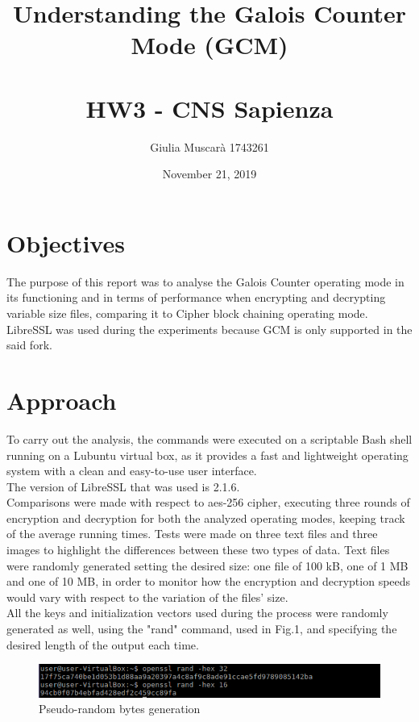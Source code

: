 \documentclass{article}
\title{Understanding the Galois Counter Mode (GCM) \\
	 \large \\ HW3 - CNS Sapienza}
\author{Giulia Muscarà 1743261}
\date{November 21, 2019}
\begin{document}
\maketitle

\section{Objectives}
The purpose of this report was to analyse the Galois Counter operating mode in its functioning and in terms of performance when encrypting and decrypting variable size files, comparing it to Cipher block chaining operating mode. LibreSSL was used during the experiments because GCM is only supported in the said fork.

\section{Approach}
To carry out the analysis, the commands were executed on a scriptable Bash shell running on a Lubuntu virtual box, as it provides a fast and lightweight operating system with a clean and easy-to-use user interface.\\ 
The version of LibreSSL that was used is 2.1.6.\\
Comparisons were made with respect to aes-256 cipher, executing three rounds of encryption and decryption for both the analyzed operating modes, keeping track of the average running times. Tests were made on three text files and three images to highlight the differences between these two types of data. Text files were randomly generated setting the desired size: one file of 100 kB, one of 1 MB and one of 10 MB, in order to monitor how the encryption and decryption speeds would vary with respect to the variation of the files' size.\\ All the keys and initialization vectors used during the process were randomly generated as well, using the "rand" command, used in Fig.1, and specifying the desired length of the output each time. \\

\begin{figure}[!h]
\includegraphics[width=1\textwidth]{"img1-hw3-1743261.PNG"}
\caption{Pseudo-random bytes generation}
\end{figure}

\clearpage
\end{document}
